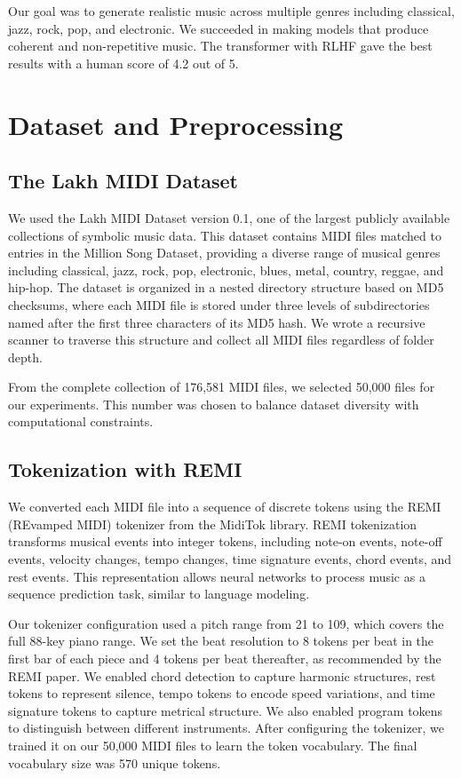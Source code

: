 \documentclass{article}
\theoremstyle{plain}
\theoremstyle{definition}
\theoremstyle{remark}
\begin{document}
Our goal was to generate realistic music across multiple genres including classical, jazz, rock, pop, and electronic. We succeeded in making models that produce coherent and non-repetitive music. The transformer with RLHF gave the best results with a human score of 4.2 out of 5.

\section{Dataset and Preprocessing}

\subsection{The Lakh MIDI Dataset}

We used the Lakh MIDI Dataset version 0.1, one of the largest publicly available collections of symbolic music data. This dataset contains MIDI files matched to entries in the Million Song Dataset, providing a diverse range of musical genres including classical, jazz, rock, pop, electronic, blues, metal, country, reggae, and hip-hop. The dataset is organized in a nested directory structure based on MD5 checksums, where each MIDI file is stored under three levels of subdirectories named after the first three characters of its MD5 hash. We wrote a recursive scanner to traverse this structure and collect all MIDI files regardless of folder depth.

From the complete collection of 176,581 MIDI files, we selected 50,000 files for our experiments. This number was chosen to balance dataset diversity with computational constraints.

\subsection{Tokenization with REMI}
We converted each MIDI file into a sequence of discrete tokens using the REMI (REvamped MIDI) tokenizer from the MidiTok library. REMI tokenization transforms musical events into integer tokens, including note-on events, note-off events, velocity changes, tempo changes, time signature events, chord events, and rest events. This representation allows neural networks to process music as a sequence prediction task, similar to language modeling.

Our tokenizer configuration used a pitch range from 21 to 109, which covers the full 88-key piano range. We set the beat resolution to 8 tokens per beat in the first bar of each piece and 4 tokens per beat thereafter, as recommended by the REMI paper. We enabled chord detection to capture harmonic structures, rest tokens to represent silence, tempo tokens to encode speed variations, and time signature tokens to capture metrical structure. We also enabled program tokens to distinguish between different instruments. After configuring the tokenizer, we trained it on our 50,000 MIDI files to learn the token vocabulary. The final vocabulary size was 570 unique tokens.
\end{document}
